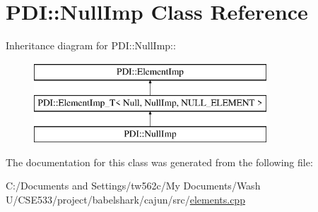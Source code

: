 \hypertarget{class_p_d_i_1_1_null_imp}{
\section{PDI::NullImp Class Reference}
\label{class_p_d_i_1_1_null_imp}
}
Inheritance diagram for PDI::NullImp::\begin{figure}[H]
\begin{center}
\leavevmode
\includegraphics[height=3cm]{class_p_d_i_1_1_null_imp}
\end{center}
\end{figure}


The documentation for this class was generated from the following file:\begin{CompactItemize}
\item 
C:/Documents and Settings/tw562c/My Documents/Wash U/CSE533/project/babelshark/cajun/src/\hyperlink{elements_8cpp}{elements.cpp}\end{CompactItemize}
